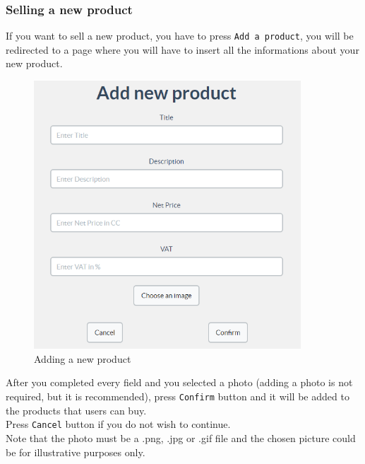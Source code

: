 		\subsubsection{Selling a new product}
		If you want to sell a new product, you have to press \texttt{Add a product}, you 
		will be redirected to a page where you will have to insert all the 
		informations about your new product.
		\begin{figure}[H]
			\includegraphics[width=10cm]{res/images/add_new_product.png}
			\centering
			\caption{Adding a new product}
		\end{figure}
		\noindent After you completed every field and you selected a photo 
		(adding a photo is not required, but it is recommended),
		press \texttt{Confirm} button and 
		it will be added to the products that users can buy.
		\\Press \texttt{Cancel} button if you do not wish to continue.
		\\Note that the photo must be a .png, .jpg or .gif file and the 
		 chosen picture could be for illustrative purposes only.
		 
